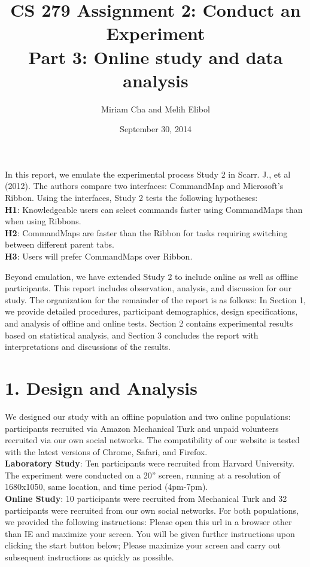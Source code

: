 \documentclass{article}
\title{CS 279 Assignment 2: Conduct an Experiment\\Part 3: Online study and data analysis}
\author{Miriam Cha and Melih Elibol}
\date{September 30, 2014}
\begin{document}
\maketitle

In this report, we emulate the experimental process Study 2 in Scarr. J., et al (2012). The authors compare two interfaces: CommandMap and Microsoft's Ribbon. Using the interfaces, Study 2 tests the following hypotheses:
\\
\noindent 
\textbf{H1}: Knowledgeable users can select commands faster using CommandMaps than when using Ribbons.\\
\textbf{H2}: CommandMaps are faster than the Ribbon for tasks requiring switching between different parent tabs.\\
\textbf{H3}: Users will prefer CommandMaps over Ribbon. 

Beyond emulation, we have extended Study 2 to include online as well as offline participants. This report includes observation, analysis, and discussion for our study. The organization for the remainder of the report is as follows: In Section 1, we provide detailed procedures, participant demographics, design specifications, and analysis of offline and online tests. Section 2 contains experimental results based on statistical analysis, and Section 3 concludes the report with interpretations and discussions of the results. 

\section*{1. Design and Analysis}
We designed our study with an offline population and two online populations: participants recruited via Amazon Mechanical Turk and unpaid volunteers recruited via our own social networks. The compatibility of our website is tested with the latest versions of Chrome, Safari, and Firefox. 
\\

\noindent
\textbf{Laboratory Study}: Ten participants were recruited from Harvard University. The experiment were conducted on a 20'' screen, running at a resolution of 1680x1050, same location, and time period (4pm-7pm).\\

\noindent\textbf{Online Study}: 10 participants were recruited from Mechanical Turk and 32 participants were recruited from our own social networks. For both populations, we provided the following instructions: Please open this url in a browser other than IE and maximize your screen. You will be given further instructions upon clicking the start button below; Please maximize your screen and carry out subsequent instructions as quickly as possible. 
\end{document}
